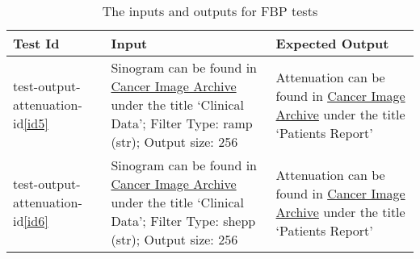 \documentclass[12pt, titlepage]{article}
\begin{document}
\begin{table}[H]
  \centering
  \begin{tabularx}{\linewidth}{|X|X|X|}
    \hline
    Test Id                                  & Input                                            & Expected Output                                                                                                                             \\
    \hline
    test-output-attenuation-id\ref{id5}         & Sinogram can be found in
                                                   \href{https://www.cancerimagingarchive.net/collection/ldct-and-projection-data/}{Cancer
                                                   Image Archive} under the
                                                   title \lq Clinical
                                                   Data\rq; Filter Type:
                                                   ramp (str); Output size:
                                                   256 & Attenuation can be found in
                                                   \href{https://www.cancerimagingarchive.net/collection/ldct-and-projection-data/}{Cancer
                                                   Image Archive} under the
                                                   title \lq Patients Report\rq \\ \hline
    test-output-attenuation-id\ref{id6}         & Sinogram can be found in
                                                       \href{https://www.cancerimagingarchive.net/collection/ldct-and-projection-data/}{Cancer
                                                       Image Archive} under the
                                                       title \lq Clinical
                                                       Data\rq; Filter Type:
                                                       shepp (str); Output size:
                                                       256 & Attenuation can be found in
                                                       \href{https://www.cancerimagingarchive.net/collection/ldct-and-projection-data/}{Cancer
                                                       Image Archive} under the
                                                       title \lq Patients
                                                             Report\rq \\ \hline
  \end{tabularx}
  \caption{The inputs and outputs for FBP tests}
  \label{Table B}
\end{table}
\end{document}
